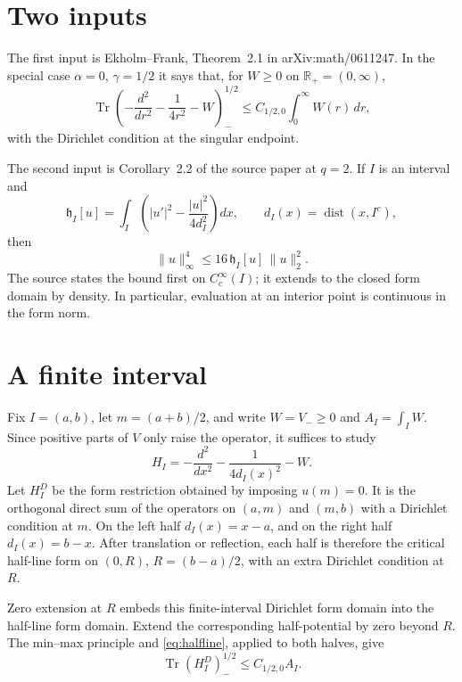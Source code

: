 \documentclass[11pt]{article}
\newcommand{\R}{\mathbb R}
\newcommand{\Tr}{\operatorname{Tr}}
\newcommand{\dist}{\operatorname{dist}}
\begin{document}
\section{Two inputs}

The first input is Ekholm--Frank, Theorem~2.1 in
arXiv:math/0611247.  In the special case $\alpha=0$, $\gamma=1/2$ it says
that, for $W\ge0$ on $\R_+=(0,\infty)$,
\begin{equation}\label{eq:halfline}
 \Tr\left(-\frac{d^2}{dr^2}-\frac1{4r^2}-W\right)_-^{1/2}
 \le C_{1/2,0}\int_0^\infty W(r)\,dr,
\end{equation}
with the Dirichlet condition at the singular endpoint.

The second input is Corollary~2.2 of the source paper at $q=2$.  If $I$ is
an interval and
\begin{equation}\label{eq:hardyform}
 \mathfrak h_I[u]=\int_I\left(|u'|^2-\frac{|u|^2}{4d_I^2}\right)dx,
 \qquad d_I(x)=\dist(x,I^c),
\end{equation}
then
\begin{equation}\label{eq:pointwise}
 \|u\|_\infty^4\le16\,\mathfrak h_I[u]\,\|u\|_2^2.
\end{equation}
The source states the bound first on $C_c^\infty(I)$; it extends to the
closed form domain by density.  In particular, evaluation at an interior
point is continuous in the form norm.

\section{A finite interval}

Fix $I=(a,b)$, let $m=(a+b)/2$, and write $W=V_-\ge0$ and
$A_I=\int_IW$.  Since positive parts of $V$ only raise the operator, it
suffices to study
$$H_I=-\frac{d^2}{dx^2}-\frac1{4d_I(x)^2}-W.$$
Let $H_I^D$ be the form restriction obtained by imposing $u(m)=0$.  It is the
orthogonal direct sum of the operators on $(a,m)$ and $(m,b)$ with a
Dirichlet condition at $m$.  On the left half $d_I(x)=x-a$, and on the right
half $d_I(x)=b-x$.  After translation or reflection, each half is therefore
the critical half-line form on $(0,R)$, $R=(b-a)/2$, with an extra Dirichlet
condition at $R$.

Zero extension at $R$ embeds this finite-interval Dirichlet form domain into
the half-line form domain.  Extend the corresponding half-potential by zero
beyond $R$.  The min--max principle and \eqref{eq:halfline}, applied to both
halves, give
\begin{equation}\label{eq:split}
 \Tr(H_I^D)_-^{1/2}\le C_{1/2,0}A_I.
\end{equation}
\end{document}
